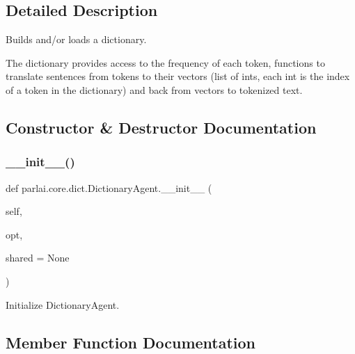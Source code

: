 \subsection{Detailed Description}
\begin{DoxyVerb}Builds and/or loads a dictionary.

The dictionary provides access to the frequency of each token, functions to
translate sentences from tokens to their vectors (list of ints, each int is the
index of a token in the dictionary) and back from vectors to tokenized text.
\end{DoxyVerb}
 

\subsection{Constructor \& Destructor Documentation}
\mbox{\label{classparlai_1_1core_1_1dict_1_1DictionaryAgent_a324531500b43e0039f2c0087081a8b3d}} 
\subsubsection{\texorpdfstring{\+\_\+\+\_\+init\+\_\+\+\_\+()}{\_\_init\_\_()}}
{\footnotesize\ttfamily def parlai.\+core.\+dict.\+Dictionary\+Agent.\+\_\+\+\_\+init\+\_\+\+\_\+ (\begin{DoxyParamCaption}\item[{}]{self,  }\item[{}]{opt,  }\item[{}]{shared = {\ttfamily None} }\end{DoxyParamCaption})}

\begin{DoxyVerb}Initialize DictionaryAgent.
\end{DoxyVerb}
 

\subsection{Member Function Documentation}
\mbox{\label{classparlai_1_1core_1_1dict_1_1DictionaryAgent_a29f4181dcdd5f53103bc342bf5f3c74a}} 

